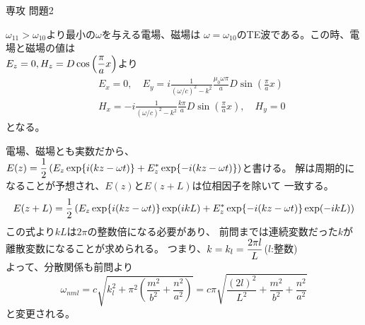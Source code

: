 \documentclass[fleqn]{jbook}
\begin{document}
\begin{answer}{専攻 問題2}{}
\begin{subanswers}
  $\omega_{11}>\omega_{10}$より最小の$\omega$を与える電場、磁場は
  $\omega=\omega_{10}$のTE波である。この時、電場と磁場の値は\\
  $E_{z}=0,H_{z}=D\cos \left( \displaystyle\frac{\pi}{a} x \right)$より
%
  \begin{eqnarray*}
   && E_{x}=0, \quad%
      E_{y}= i\frac{1}{(\omega/c)^2-k^2}\frac{\mu_{0}\omega \pi}{a}%
             D\sin \left( \frac{\pi}{a}x \right) \\
   && H_{x}=-i\frac{1}{(\omega/c)^2-k^2}\frac{k \pi}{a}%
             D\sin\left( \frac{\pi}{a}x \right), \quad%
      H_{y}=0
  \end{eqnarray*}
%
  となる。
 

\SubAnswer
  電場、磁場とも実数だから、
  $E(z)=\displaystyle\frac{1}{2}\left( E_z\exp \{i(kz-\omega t)\} + 
  E_z^{*}\exp \{-i(kz-\omega t)\} \right)$と書ける。
  解は周期的になることが予想され、$E(z)$と$E(z+L)$は位相因子を除いて
  一致する。
%
  \[ E(z+L)=\ds\frac{1}{2}%
     \left( E_z\exp \{i(kz-\omega t)\}%
     \exp(ikL) + E_z^{*}\exp \{-i(kz-\omega t)\} \exp (-ikL) \right) \]
%
  この式より$kL$は$2\pi$の整数倍になる必要があり、
  前問までは連続変数だった$k$が離散変数になることが求められる。
  つまり、$k=k_{l}=\displaystyle\frac{2\pi l}{L}$($l$:整数)\\
%
  よって、分散関係も前問より
%
  \[ \omega_{nml}=c \sqrt{k_{l}^{2}+\pi^{2}%
     \left( \frac{m^2}{b^2}+\frac{n^2}{a^2} \right)}%
     =c\pi\sqrt{\frac{(2l)^2}{L^2}+\frac{m^2}{b^2}+\frac{n^2}{a^2}} \]
%
  と変更される。

\end{subanswers}
\end{answer}
\end{document}
